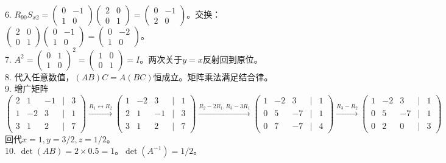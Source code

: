 6. $R_{90}S_{x2}=\begin{pmatrix}0&-1\\1&0\end{pmatrix}\begin{pmatrix}2&0\\0&1\end{pmatrix}=\begin{pmatrix}0&-1\\2&0\end{pmatrix}$。交换：$\begin{pmatrix}2&0\\0&1\end{pmatrix}\begin{pmatrix}0&-1\\1&0\end{pmatrix}=\begin{pmatrix}0&-2\\1&0\end{pmatrix}$。\\
7. $A^2=\begin{pmatrix}0&1\\1&0\end{pmatrix}^2=\begin{pmatrix}1&0\\0&1\end{pmatrix}=I$。两次关于$y=x$反射回到原位。\\
8. 代入任意数值，$(AB)C=A(BC)$恒成立。矩阵乘法满足结合律。\\
9. 增广矩阵$\begin{pmatrix}2&1&-1&|&3\\1&-2&3&|&1\\3&1&2&|&7\end{pmatrix}\xrightarrow{R_1\leftrightarrow R_2}\begin{pmatrix}1&-2&3&|&1\\2&1&-1&|&3\\3&1&2&|&7\end{pmatrix}\xrightarrow{R_2-2R_1,R_3-3R_1}\begin{pmatrix}1&-2&3&|&1\\0&5&-7&|&1\\0&7&-7&|&4\end{pmatrix}\xrightarrow{R_3-R_2}\begin{pmatrix}1&-2&3&|&1\\0&5&-7&|&1\\0&2&0&|&3\end{pmatrix}$回代$x=1,y=3/2,z=1/2$。\\
10. $\det(AB)=2\times0.5=1$。$\det(A^{-1})=1/2$。\\

